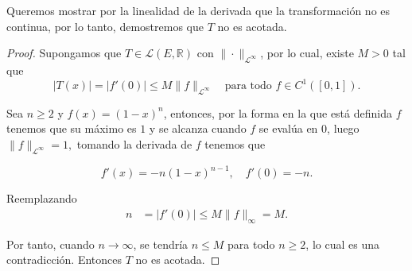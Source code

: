 \begin{enumerate}
\begin{sol}
Queremos mostrar por la linealidad de la derivada que la transformación no es continua,  por lo tanto, demostremos que $T$ no es acotada.
\begin{proof}

Supongamos que $T \in \mathcal{L}(E, \mathbb{R})$ con $\|\cdot\|_{\mathcal{L}^\infty}$, por lo cual,  existe $M > 0$ tal que 
$$
|T(x)| = |f'(0)| \leq M \|f\|_{\mathcal{L}^\infty }\quad \text{para todo } f \in C^1([0,1]).
$$

Sea $n \geq 2$ y $f(x) = (1 - x)^n$,  entonces, por la forma en la que está definida $f$ tenemos que su máximo es $1$ y se alcanza cuando $f$ se evalúa en $0$, luego $
\|f\|_{\mathcal{L}^\infty} = 1,$ tomando la derivada de $f$ tenemos que

$$
f'(x) = -n(1 - x)^{n - 1}, \quad f'(0) = -n.
$$

Reemplazando
\begin{align*}
n &= |f'(0)| \leq M \|f\|_\infty = M.
\end{align*}

Por tanto, cuando $n \to \infty$, se tendría $n \leq M$ para todo $n \geq 2$, lo cual es una contradicción. Entonces $T$ no es acotada.

\end{proof}
        
\end{sol}
\end{enumerate}
\newpage

